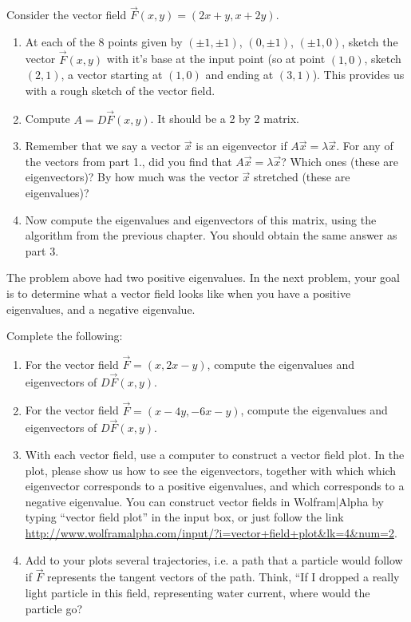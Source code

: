 \begin{problem}
Consider the vector field $\vec F(x,y) = (2x+y, x+2y)$. 
\begin{enumerate}
 \item At each of the 8 points given by $(\pm 1, \pm 1)$, $(0, \pm 1)$, $(\pm 1, 0)$, sketch the vector $\vec F(x,y)$ with it's base at the input point (so at point $(1,0)$, sketch $(2,1)$, a vector starting at $(1,0)$ and ending at $(3,1)$).  This provides us with a rough sketch of the vector field.
 \item Compute $A=D\vec F(x,y)$. It should be a 2 by 2 matrix. 
 \item Remember that we say a vector $\vec x$ is an eigenvector if $A\vec x = \lambda \vec x$.  For any of the vectors from part 1., did you find that $A\vec x = \lambda \vec x$?  Which ones (these are eigenvectors)?  By how much was the vector $\vec x$ stretched (these are eigenvalues)? 
 \item Now compute the eigenvalues and eigenvectors of this matrix, using the algorithm from the previous chapter.  You should obtain the same answer as part 3.
\end{enumerate}
\end{problem}
The problem above had two positive eigenvalues. In the next problem, your goal is to determine what a vector field looks like when you have a positive eigenvalues, and a negative eigenvalue.

\begin{problem}
Complete the following:
\begin{enumerate}
 \item For the vector field $\vec F = (x, 2x-y)$, compute the eigenvalues and eigenvectors of $D\vec F(x,y)$. 
 \item For the vector field $\vec F = (x-4y, -6x-y)$, compute the eigenvalues and eigenvectors of $D\vec F(x,y)$. 
 \item With each vector field, use a computer to construct a vector field plot.  In the plot, please show us how to see the eigenvectors, together with which which eigenvector corresponds to a positive eigenvalues, and which corresponds to a negative eigenvalue. You can construct vector fields in Wolfram|Alpha by typing ``vector field plot'' in the input box, or just  follow the link \url{http://www.wolframalpha.com/input/?i=vector+field+plot&lk=4&num=2}.
 \item Add to your plots several trajectories, i.e. a path that a particle would follow if $\vec F$ represents the tangent vectors of the path.  Think, ``If I dropped a really light particle in this field, representing water current, where would the particle go? 
\end{enumerate}
\end{problem}

